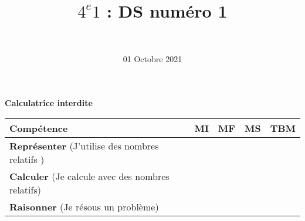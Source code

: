 \documentclass[a4paper,11pt]{exam}
\author{\ }
\date{01 Octobre 2021}
\title{$4^e 1$ : DS num\'ero 1}
\begin{document}
%	

	\maketitle
%	
\begin{center}
	\textbf{Calculatrice interdite}
\end{center}

\begin{small}
	\begin{center}
		\begin{tabular}{|@{\ }l@{\ }|@{\ }c@{\ }|@{\ }c@{\ }|@{\ }c@{\ }|@{\ }c@{\ }|}
			\hline
			\textbf{Compétence} & \textbf{MI} & \textbf{MF} & \textbf{MS} & \textbf{TBM} \\
			\hline
			\textbf{Représenter} (J'utilise des nombres relatifs ) &  \ \ & \ \ & \ \ & \ \  \\
			\hline
			
			\textbf{Calculer} (Je calcule avec des nombres relatifs)&  \ \ & \ \ & \ \ & \ \  \\
			\hline	
			\textbf{Raisonner} (Je résous un problème) & \ \ & \ \ &  \ \  & \ \ \\
			\hline
%			 
		\end{tabular}
	\end{center}
\end{small}	

	




\newpage
















\label{LastPage}

%
\end{document}
